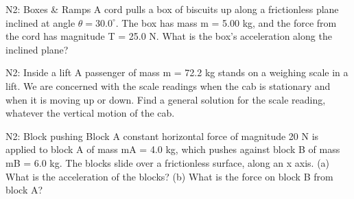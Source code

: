 \begin{frame}{N2: Boxes \& Ramps}
\scriptsize
A cord pulls a box of biscuits up along a frictionless plane inclined at angle $\theta = 30.0^{\circ}$. The box has mass m = 5.00 kg, and the force from the cord has magnitude T = 25.0 N. What is the box's acceleration along the inclined plane?
\vspace{8cm}
\end{frame}


\begin{frame}{N2: Inside a lift}
\scriptsize
A passenger of mass m = 72.2 kg stands on a weighing scale in a lift. We are concerned with the scale readings when the cab is stationary and when it is moving up or down.  Find a general solution for the scale reading, whatever the vertical motion of the cab.
\vspace{8cm}
\end{frame}


\begin{frame}{N2: Block pushing Block}
\scriptsize
A constant horizontal force of magnitude 20 N is applied to block A of mass mA = 4.0 kg, which pushes against block B of mass mB = 6.0 kg. The blocks slide over a frictionless surface, along an x axis. (a) What is the acceleration of the blocks? (b) What is the force on block B from block A?
\vspace{8cm}
\end{frame}





%
%
%
%
%
%
%
%


